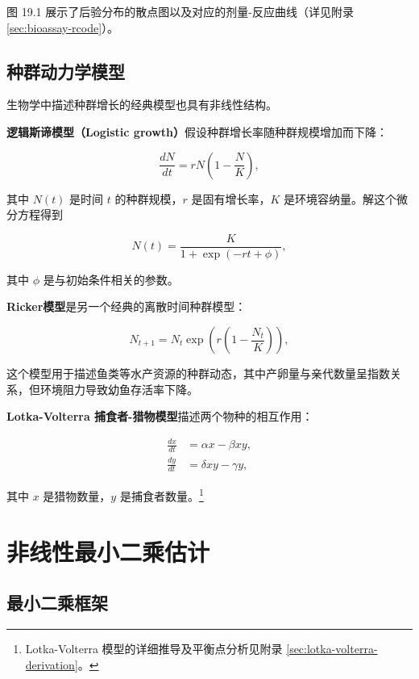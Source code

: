 图 19.1 展示了后验分布的散点图以及对应的剂量-反应曲线（详见附录 \cref{sec:bioassay-rcode}）。

\subsection{种群动力学模型}

生物学中描述种群增长的经典模型也具有非线性结构。

\textbf{逻辑斯谛模型（Logistic growth）}假设种群增长率随种群规模增加而下降：

\begin{equation}
\frac{dN}{dt} = rN\left(1 - \frac{N}{K}\right), \label{eq:logistic-growth}
\end{equation}

其中 $N(t)$ 是时间 $t$ 的种群规模，$r$ 是固有增长率，$K$ 是环境容纳量。解这个微分方程得到

\begin{equation}
N(t) = \frac{K}{1 + \exp(-rt + \phi)}, \label{eq:logistic-solution}
\end{equation}

其中 $\phi$ 是与初始条件相关的参数。

\textbf{Ricker模型}是另一个经典的离散时间种群模型：

\begin{equation}
N_{t+1} = N_t \exp\left(r\left(1 - \frac{N_t}{K}\right)\right), \label{eq:ricker-model}
\end{equation}

这个模型用于描述鱼类等水产资源的种群动态，其中产卵量与亲代数量呈指数关系，但环境阻力导致幼鱼存活率下降。

\textbf{Lotka-Volterra 捕食者-猎物模型}描述两个物种的相互作用：

\begin{align}
\frac{dx}{dt} &= \alpha x - \beta xy, \label{eq:lotka-prey} \\
\frac{dy}{dt} &= \delta xy - \gamma y, \label{eq:lotka-predator}
\end{align}

其中 $x$ 是猎物数量，$y$ 是捕食者数量。\footnote{Lotka-Volterra 模型的详细推导及平衡点分析见附录 \cref{sec:lotka-volterra-derivation}。}

\section{非线性最小二乘估计}

\subsection{最小二乘框架}

